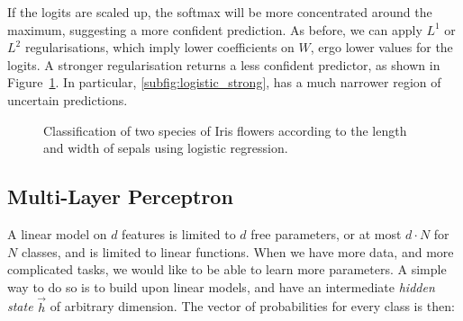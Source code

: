 If the logits are scaled up, the softmax will be more concentrated around the maximum, suggesting a more confident prediction.
As before, we can apply $L^1$ or $L^2$ regularisations, which imply lower coefficients on $W$, ergo lower values for the logits.
A stronger regularisation returns a less confident predictor, as shown in Figure~\ref{fig:logistic}.
In particular, \ref{subfig:logistic_strong}, has a much narrower region of uncertain predictions. 

\begin{figure}
	\centering
	\caption{Classification of two species of Iris flowers according to the length and width of sepals using logistic regression.}\label{fig:logistic}
\end{figure}


\subsection{Multi-Layer Perceptron}\label{sec:mlp}
A linear model on $d$ features is limited to $d$ free parameters, or at most $d \cdot N$ for $N$ classes, and is limited to linear functions.
When we have more data, and more complicated tasks, we would like to be able to learn more parameters.
A simple way to do so is to build upon linear models, and have an intermediate \emph{hidden state} $\vec{h}$ of arbitrary dimension.
The vector of probabilities for every class is then:

